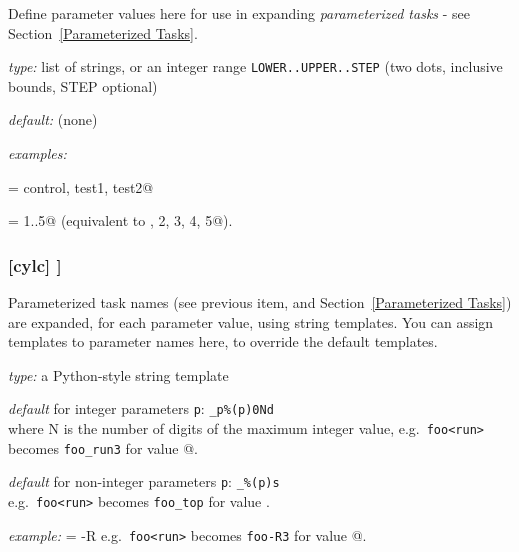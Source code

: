 Define parameter values here for use in expanding {\em parameterized tasks} -
see Section~\ref{Parameterized Tasks}.
\begin{myitemize}
    \item {\em type:} list of strings, or an integer range
        \lstinline=LOWER..UPPER..STEP= (two dots, inclusive bounds, STEP optional)
    \item {\em default:} (none)
    \item {\em examples:}
        \begin{myitemize}
            \item \lstinline@run = control, test1, test2@
            \item \lstinline@mem = 1..5@  (equivalent to , 2, 3, 4, 5@).
        \end{myitemize}
\end{myitemize}

\subsubsection[{[[}parameter templates{]]}]{[cylc] \textrightarrow [[parameter templates]]}
\label{RefParameterTemplates}

Parameterized task names (see previous item, and Section~\ref{Parameterized
Tasks}) are expanded, for each parameter value, using string templates.  You
can assign templates to parameter names here, to override the default templates.

\begin{myitemize}
    \item {\em type:} a Python-style string template
    \item {\em default} for integer parameters \lstinline=p=:
        \lstinline=_p%(p)0Nd= \\
        where N is the number of digits of the maximum integer value,
        e.g.\ \lstinline=foo<run>= becomes \lstinline=foo_run3= for
            \lstinline@run@ value @.
    \item {\em default} for non-integer parameters \lstinline=p=:
        \lstinline=_%(p)s= \\
        e.g.\ \lstinline=foo<run>= becomes \lstinline=foo_top= for
            \lstinline@run@ value \lstinline@top@.
    \item {\em example:} \lstinline@run = -R%(run)s@ \\
            e.g.\ \lstinline=foo<run>= becomes \lstinline=foo-R3= for
            \lstinline@run@ value @.
\end{myitemize}


